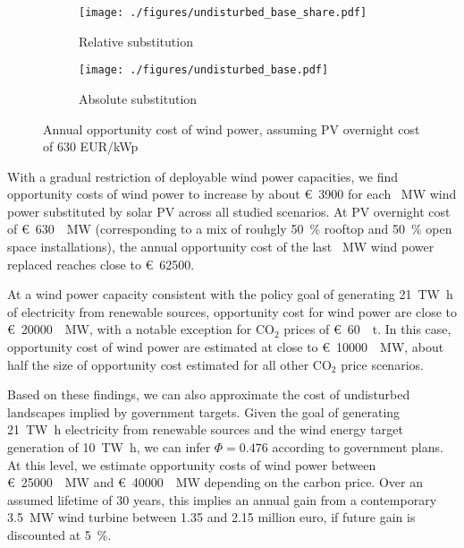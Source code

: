 \documentclass[review, 3p, times, 12pt]{elsarticle} %
\newcommand{\COO}{\ensuremath{\mathrm{CO_2}} }
\begin{document}
\begin{figure*}[h!t]
\centering
\begin{subfigure}[b]{0.475\textwidth}
\centering
\texttt{[image: ./figures/undisturbed\_base\_share.pdf]}
\caption{Relative substitution}
\label{fig:rel_substitution}
\end{subfigure}
\hfill
\begin{subfigure}[b]{0.475\textwidth}
\centering
\texttt{[image: ./figures/undisturbed\_base.pdf]}
\caption{Absolute substitution}
\label{fig:abs_substitution}
\end{subfigure}
\caption{Annual opportunity cost of wind power, assuming PV overnight cost of 630 EUR/kWp}
\label{figure:opportunity-cost-base}
\end{figure*}

With a gradual restriction of deployable wind power capacities, we find opportunity costs of wind power
to increase by about \SI{3900}[\euro]{} for each \SI{}{\mega\watt} wind power substituted by solar PV across all studied scenarios.
At PV overnight cost of \SI{630}[\euro]{\per\mega\watt} (corresponding to a mix of rouhgly \SI{50}{\percent} rooftop and
\SI{50}{\percent} open space installations), the annual opportunity cost of the last \SI{}{\mega\watt} wind power replaced reaches close to \SI{62500}[\euro]{}.

At a wind power capacity consistent with the policy goal of generating \SI{21}{\tera\watt\hour} of electricity
from renewable sources, opportunity cost for wind power are close to \SI{20000}[\euro]{\per\mega\watt}, with a
notable exception for \COO prices of \SI{60}[\euro]{\per\tonne}.
In this case, opportunity cost of wind power are estimated at close to \SI{10000}[\euro]{\per\mega\watt}, about half
the size of opportunity cost estimated for all other \COO price scenarios.

Based on these findings, we can also approximate the cost of undisturbed landscapes implied by government targets.
Given the goal of generating \SI{21}{\tera\watt\hour} electricity from renewable sources and the wind energy target
generation of \SI{10}{\tera\watt\hour}, we can infer $\Phi = 0.476$ according to government plans.
At this level, we estimate opportunity costs of wind power between \SI{25000}[\euro]{\per\mega\watt} and \SI{40000}[\euro]{\per\mega\watt} depending on the carbon price.
Over an assumed lifetime of $30$ years, this implies an annual gain from a contemporary \SI{3.5}{\mega\watt}
wind turbine between \SI{1.35}{} and \SI{2.15}{} million euro, if future gain is discounted at \SI{5}{\percent}.
\end{document}
